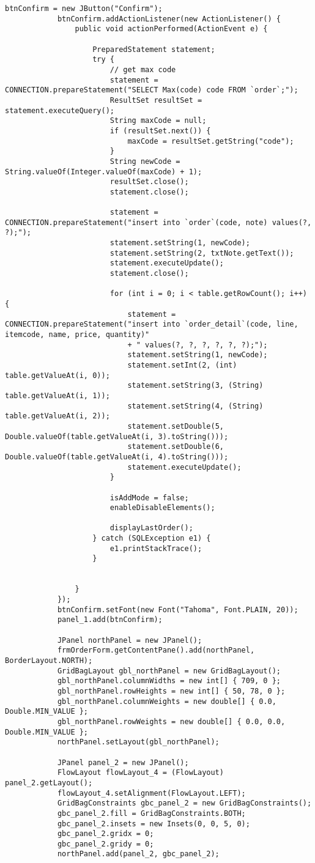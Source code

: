 \begin{lstlisting}[style=JavaStyle]
			btnConfirm = new JButton("Confirm");
			btnConfirm.addActionListener(new ActionListener() {
				public void actionPerformed(ActionEvent e) {
					
					PreparedStatement statement;
					try {
						// get max code
						statement = CONNECTION.prepareStatement("SELECT Max(code) code FROM `order`;");
						ResultSet resultSet = statement.executeQuery();
						String maxCode = null;
						if (resultSet.next()) {
							maxCode = resultSet.getString("code");
						}
						String newCode = String.valueOf(Integer.valueOf(maxCode) + 1);
						resultSet.close();
						statement.close();
						
						statement = CONNECTION.prepareStatement("insert into `order`(code, note) values(?, ?);");
						statement.setString(1, newCode);
						statement.setString(2, txtNote.getText());
						statement.executeUpdate();
						statement.close();
						
						for (int i = 0; i < table.getRowCount(); i++) {
							statement = CONNECTION.prepareStatement("insert into `order_detail`(code, line, itemcode, name, price, quantity)"
							+ " values(?, ?, ?, ?, ?, ?);");
							statement.setString(1, newCode);
							statement.setInt(2, (int) table.getValueAt(i, 0));
							statement.setString(3, (String) table.getValueAt(i, 1));
							statement.setString(4, (String) table.getValueAt(i, 2));
							statement.setDouble(5, Double.valueOf(table.getValueAt(i, 3).toString()));
							statement.setDouble(6, Double.valueOf(table.getValueAt(i, 4).toString()));
							statement.executeUpdate();
						}
						
						isAddMode = false;
						enableDisableElements();
						
						displayLastOrder();
					} catch (SQLException e1) {
						e1.printStackTrace();
					}
					
					
				}
			});
			btnConfirm.setFont(new Font("Tahoma", Font.PLAIN, 20));
			panel_1.add(btnConfirm);
			
			JPanel northPanel = new JPanel();
			frmOrderForm.getContentPane().add(northPanel, BorderLayout.NORTH);
			GridBagLayout gbl_northPanel = new GridBagLayout();
			gbl_northPanel.columnWidths = new int[] { 709, 0 };
			gbl_northPanel.rowHeights = new int[] { 50, 78, 0 };
			gbl_northPanel.columnWeights = new double[] { 0.0, Double.MIN_VALUE };
			gbl_northPanel.rowWeights = new double[] { 0.0, 0.0, Double.MIN_VALUE };
			northPanel.setLayout(gbl_northPanel);
			
			JPanel panel_2 = new JPanel();
			FlowLayout flowLayout_4 = (FlowLayout) panel_2.getLayout();
			flowLayout_4.setAlignment(FlowLayout.LEFT);
			GridBagConstraints gbc_panel_2 = new GridBagConstraints();
			gbc_panel_2.fill = GridBagConstraints.BOTH;
			gbc_panel_2.insets = new Insets(0, 0, 5, 0);
			gbc_panel_2.gridx = 0;
			gbc_panel_2.gridy = 0;
			northPanel.add(panel_2, gbc_panel_2);
			

\end{lstlisting}
